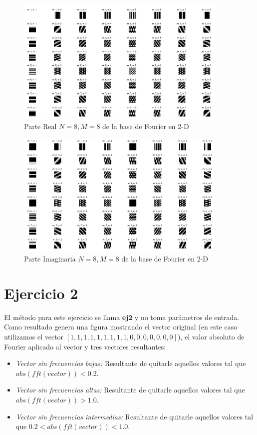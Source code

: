 \documentclass{article}
\begin{document}
\begin{figure}[H]
        \includegraphics[width=0.9\textwidth]{ej1bRealN8M8.png}
    \caption{Parte Real $N=8,M=8$ de la base de Fourier en 2-D}
\end{figure}
\begin{figure}[H]
        \includegraphics[width=0.9\textwidth]{ej1bImagN8M8.png}
    \caption{Parte Imaginaria $N=8,M=8$ de la base de Fourier en 2-D}
\end{figure}

\section*{Ejercicio 2}
El método para este ejercicio se llama \textbf{ej2} y no toma parámetros de entrada. Como resultado genera una figura mostrando el vector original (en este caso utilizamos el vector $[ 1,1,1,1,1,1,1,1,1,0,0,0,0,0,0,0 ]$), el valor absoluto de Fourier aplicado al vector y tres vectores resultantes:
\begin{itemize}
\item \textit{Vector sin frecuencias bajas:} Resultante de quitarle aquellos valores tal que $abs(fft(vector)) < 0.2$.
\item \textit{Vector sin frecuencias altas:} Resultante de quitarle aquellos valores tal que $abs(fft(vector)) > 1.0$.
\item \textit{Vector sin frecuencias intermedias:} Resultante de quitarle aquellos valores tal que $0.2 < abs(fft(vector)) < 1.0$.
\end{itemize}
\end{document}
